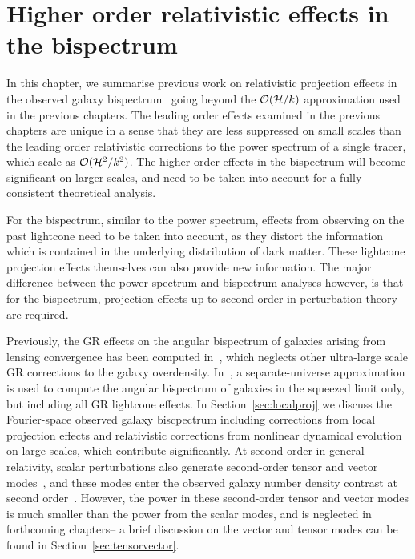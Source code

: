 
\chapter{Higher order relativistic effects in the bispectrum}
\label{chapter:ho}

In this chapter, we summarise previous work on relativistic projection effects in the observed galaxy bispectrum~\cite{Umeh:2016nuh,Jolicoeur:2017nyt,Jolicoeur:2017eyi,Jolicoeur:2018blf} going beyond the $\mathcal{O}(\mathcal{H}/k)$ approximation used in the previous chapters. The leading order effects examined in the previous chapters are unique in a sense that they are less suppressed on small scales than the leading order relativistic corrections to the power spectrum of a single tracer, which scale as $\mathcal{O}(\mathcal{H}^2/k^2)$. The higher order effects in the bispectrum will become significant on larger scales, and need to be taken into account for a fully consistent theoretical analysis.

For the bispectrum, similar to the power spectrum, effects from observing on the past lightcone need to be taken into account, as they distort the information which is contained in the underlying distribution of dark matter. These lightcone projection effects themselves can also provide new information. The major difference between the power spectrum and bispectrum analyses however, is that for the bispectrum, projection effects up to second order in perturbation theory are required. 

Previously, the GR effects on the angular bispectrum of galaxies arising from lensing convergence has been computed in~\cite{DiDio:2015bua}, which neglects other ultra-large scale GR corrections to the galaxy overdensity. In~\cite{Kehagias:2015tda}, a separate-universe approximation is used to compute the angular bispectrum of galaxies in the squeezed limit only, but including all GR lightcone effects. In Section~\ref{sec:localproj} we discuss the Fourier-space observed galaxy biscpectrum including corrections from local projection effects and relativistic corrections from nonlinear dynamical evolution on large scales, which contribute significantly. At second order in general relativity, scalar perturbations also generate second-order tensor and vector modes~\cite{Mollerach:1997up,Matarrese:1997ay}, and these modes enter the observed galaxy number density contrast at second order~\cite{Bertacca:2014hwa,Bertacca:2014wga,Bertacca:2014dra,Yoo:2014sfa,DiDio:2014lka}. However, the power in these second-order tensor and vector modes is much smaller than the power from the scalar modes, and is neglected in forthcoming chapters-- a brief discussion on the vector and tensor modes can be found in Section~\ref{sec:tensorvector}. 

